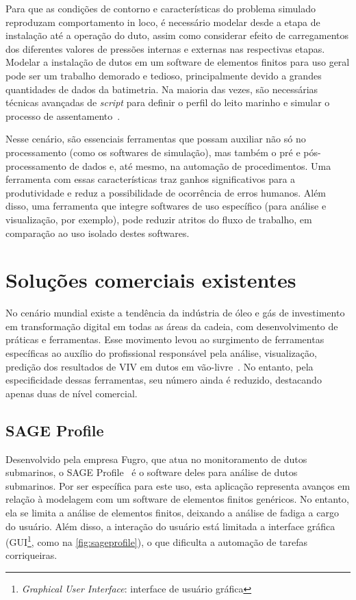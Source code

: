 Para que as condições de contorno e características do problema simulado reproduzam comportamento in loco, é necessário modelar desde a etapa de instalação até a operação do duto, assim como considerar efeito de carregamentos dos diferentes valores de pressões internas e externas nas respectivas etapas.
Modelar a instalação de dutos em um software de elementos finitos para uso geral pode ser um trabalho demorado e tedioso, principalmente devido a grandes quantidades de dados da batimetria.
Na maioria das vezes, são necessárias técnicas avançadas de \textit{script} para definir o perfil do leito marinho e simular o processo de assentamento~\cite{VandenAbeele2013}.

Nesse cenário, são essenciais ferramentas que possam auxiliar não só no processamento (como os softwares de simulação), mas também o pré e pós-processamento de dados e, até mesmo, na automação de procedimentos.
Uma ferramenta com essas características traz ganhos significativos para a produtividade e reduz a possibilidade de ocorrência de erros humanos.
Além disso, uma ferramenta que integre softwares de uso específico (para análise e visualização, por exemplo), pode reduzir atritos do fluxo de trabalho, em comparação ao uso isolado destes softwares.


\section{Soluções comerciais existentes}


No cenário mundial existe a tendência da indústria de óleo e gás de investimento em transformação digital em todas as áreas da cadeia, com desenvolvimento de práticas e ferramentas. Esse movimento levou ao surgimento de ferramentas específicas ao auxílio do profissional responsável pela análise, visualização, predição dos resultados de VIV em dutos em vão-livre~\cite{Mittal2017}. No entanto, pela especificidade dessas ferramentas, seu número ainda é reduzido, destacando apenas duas de nível comercial.


\subsection{SAGE Profile}


Desenvolvido pela empresa Fugro, que atua no monitoramento de dutos submarinos, o SAGE Profile~\cite{sageprofile} é o software deles para análise de dutos submarinos. Por ser específica para este uso, esta aplicação representa avanços em relação à modelagem com um software de elementos finitos genéricos. No entanto, ela se limita a análise de elementos finitos, deixando a análise de fadiga a cargo do usuário. Além disso, a interação do usuário está limitada a interface gráfica (GUI\footnote{\textit{Graphical User Interface}: interface de usuário gráfica}, como na \autoref{fig:sageprofile}), o que dificulta a automação de tarefas corriqueiras.

